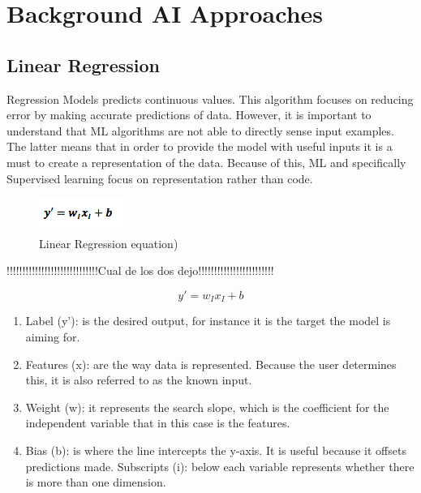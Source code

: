 

\section{Background \acl{AI} Approaches}
\label{sec:related}

\subsection{Linear Regression}

Regression Models predicts continuous values. This algorithm focuses on reducing error by making accurate predictions of data. However, it is important to understand that \ac{ML} algorithms are not able to directly sense input examples. The latter means that in order to provide the model with useful inputs it is a must to create a representation of the data. Because of this, \ac{ML} and specifically Supervised learning focus on representation rather than code. 

\begin{figure}[htbp]
  \centering
  \includegraphics[width=\textwidth]{images/regresion}
  \caption{Linear Regression equation)}
  \label{fig:regresion}
\end{figure}

!!!!!!!!!!!!!!!!!!!!!!!!!!!!!Cual de los dos dejo!!!!!!!!!!!!!!!!!!!!!!!!

\begin{equation} \label{eq:linearReg}
y'=w_I x_I+b
\end{equation}

\begin{enumerate}
 \item Label (y’): is the desired output, for instance it is the target the model is aiming for.
 \item Features (x):  are the way data is represented. Because the user determines this, it is also referred to as the known input.  
 \item Weight (w):  it represents the search slope, which is the coefficient for the independent variable that in this case is the features.  
 \item Bias (b): is where the line intercepts the y-axis. It is useful because it offsets predictions made. 
Subscripts (i): below each variable represents whether there is more than one dimension.
\end{enumerate}


